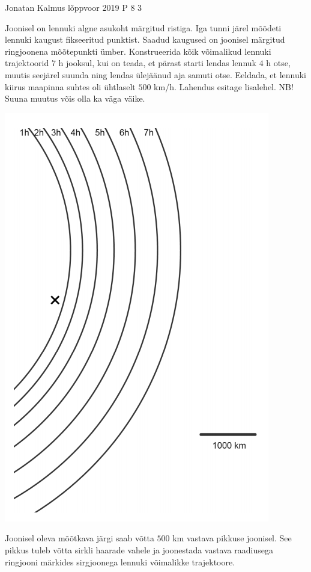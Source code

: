 {Jonatan Kalmus} %
{lõppvoor} %
{2019} %
{P 8} %
{3} %
{

\ifStatement
Joonisel on lennuki algne asukoht märgitud ristiga. Iga tunni järel mõõdeti lennuki kaugust fikseeritud punktist. Saadud kaugused on joonisel märgitud ringjoonena mõõtepunkti ümber. Konstrueerida kõik võimalikud lennuki trajektoorid $7$ h jooksul, kui on teada, et pärast starti lendas lennuk $4$ h otse, muutis seejärel suunda ning lendas ülejäänud aja samuti otse. Eeldada, et lennuki kiirus maapinna suhtes oli ühtlaselt $500$ km/h. Lahendus esitage lisalehel. NB! Suuna muutus võis olla ka väga väike.
\begin{center}
	\includegraphics[width=0.5\linewidth]{2019-v3p-08-yl.PNG}
\end{center}
\fi

\ifHint
Joonisel oleva mõõtkava järgi saab võtta $500$ km vastava pikkuse joonisel. See pikkus tuleb võtta sirkli haarade vahele ja joonestada vastava raadiusega ringjooni märkides sirgjoonega lennuki võimalikke trajektoore.
\fi

}

